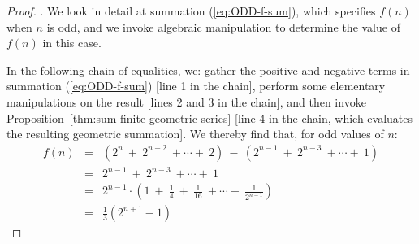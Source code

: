 \begin{proof}
\medskip

.
We look in detail at summation (\ref{eq:ODD-f-sum}), which specifies
$f(n)$ when $n$ is odd, and we invoke algebraic manipulation to
determine the value of $f(n)$ in this case.

In the following chain of equalities, we: gather the positive and
negative terms in summation (\ref{eq:ODD-f-sum}) [line 1 in the
  chain], perform some elementary manipulations on the result [lines 2
  and 3 in the chain], and then invoke
Proposition~\ref{thm:sum-finite-geometric-series} [line 4 in the
  chain, which evaluates the resulting geometric summation].  We
thereby find that, for odd values of $n$:
\begin{eqnarray*}
\label{eq:ODD-soln-f-sum}
f(n)
  & = &
\left(2^{n} \ + \ 2^{n-2} \ + \cdots + \ 2 \right) \ - \
  \left(2^{n-1} \ + \ 2^{n-3} \ + \cdots + \ 1 \right) \\
    & = &
2^{n-1} \ + \ 2^{n-3} \ + \cdots + \ 1  \\
    & = &
2^{n-1} \cdot \left( 1 \ + \ \frac{1}{4} \ + \ \frac{1}{16}  \ +
\cdots + \ \frac{1}{2^{n-1}} \right) \\
    & = &
\frac{1}{3} \left(2^{n+1} - 1 \right) 
\end{eqnarray*}

\bigskip


\end{proof}
